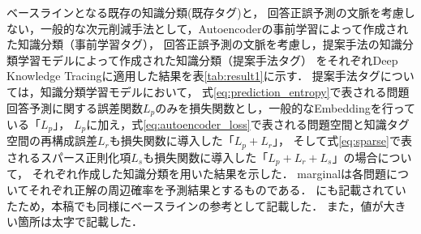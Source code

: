 \begin{table}[!htb]
\caption{各知識分類の知識獲得予測における予測性能}
\label{tab:result1}
\begin{center}
\end{center}
\end{table}


ベースラインとなる既存の知識分類(既存タグ)と，
回答正誤予測の文脈を考慮しない，一般的な次元削減手法として，Autoencoderの事前学習によって作成された知識分類（事前学習タグ），
回答正誤予測の文脈を考慮し，提案手法の知識分類学習モデルによって作成された知識分類（提案手法タグ）
をそれぞれDeep Knowledge Tracingに適用した結果を表\ref{tab:result1}に示す．
提案手法タグについては，知識分類学習モデルにおいて，
式\ref{eq:prediction_entropy}で表される問題回答予測に関する誤差関数$L_p$のみを損失関数とし，一般的なEmbeddingを行っている「$L_p$」，
$L_pに加え，$式\ref{eq:autoencoder_loss}で表される問題空間と知識タグ空間の再構成誤差$L_r$も損失関数に導入した「$L_p + L_r$」，
そして式\ref{eq:sparse}で表されるスパース正則化項$L_s$も損失関数に導入した「$L_p + L_r + L_s$」の場合について，
それぞれ作成した知識分類を用いた結果を示した．
marginalは各問題についてそれぞれ正解の周辺確率を予測結果とするものである．
\cite{piech2015deep}にも記載されていたため，本稿でも同様にベースラインの参考として記載した．
また，値が大きい箇所は太字で記載した．

